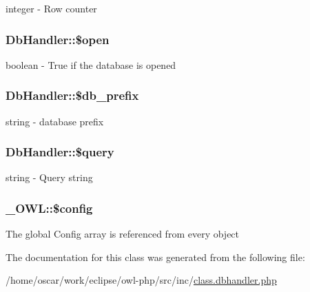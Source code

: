 integer - Row counter \hypertarget{classDbHandler_e159a609794f8ef7451e2dbb597506e8}{
\subsubsection{\setlength{\rightskip}{0pt plus 5cm}DbHandler::\$open}}
\label{classDbHandler_e159a609794f8ef7451e2dbb597506e8}


boolean - True if the database is opened \hypertarget{classDbHandler_19af96598e7f72673fc5da26ad77731b}{
\subsubsection{\setlength{\rightskip}{0pt plus 5cm}DbHandler::\$db\_\-prefix}}
\label{classDbHandler_19af96598e7f72673fc5da26ad77731b}


string - database prefix \hypertarget{classDbHandler_d671b5596b37dac6d48a660a07775965}{
\subsubsection{\setlength{\rightskip}{0pt plus 5cm}DbHandler::\$query}}
\label{classDbHandler_d671b5596b37dac6d48a660a07775965}


string - Query string \hypertarget{class__OWL_f37a011667dda12fc417a68a6f3077d1}{
\subsubsection{\setlength{\rightskip}{0pt plus 5cm}\_\-OWL::\$config}}
\label{class__OWL_f37a011667dda12fc417a68a6f3077d1}


The global Config array is referenced from every object 

The documentation for this class was generated from the following file:\begin{CompactItemize}
\item 
/home/oscar/work/eclipse/owl-php/src/inc/\hyperlink{class_8dbhandler_8php}{class.dbhandler.php}\end{CompactItemize}
